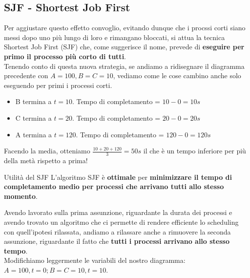 \documentclass[12pt]{report}
\begin{document}
	\subsection{SJF - Shortest Job First}
	Per aggiustare questo effetto convoglio, evitando dunque che i procssi corti siano messi dopo uno più lungo di loro e rimangano bloccati, si attua la tecnica Shortest Job First (SJF) che, come suggerisce il nome, prevede di \textbf{eseguire per primo il processo più corto di tutti}.\\
	Tenendo conto di questa nuova strategia, se andiamo a ridisegnare il diagramma precedente con $A=100, B=C=10$, vediamo come le cose cambino anche solo eseguendo per primi i processi corti.
	\begin{figure}[htbp]
		\centering
	\end{figure}
	\begin{itemize}
		\item B termina a $t=10$. Tempo di completamento = $10-0=10s$
		\item C termina a $t=20$. Tempo di completamento = $20-0=20s$
		\item A termina a $t=120$. Tempo di completamento = $120-0=120s$
	\end{itemize}
	Facendo la media, otteniamo $\frac{10+20+120}{3} = 50s$ il che è un tempo inferiore per più della metà rispetto a prima!\\
	\begin{osservazione}{Utilità del SJF}{}
		L'algoritmo SJF è \textbf{ottimale} per \textbf{minimizzare il tempo di completamento medio per processi che arrivano tutti allo stesso momento}.
	\end{osservazione}
	\smallbreak
	
	Avendo lavorato sulla prima assunzione, riguardante la durata dei processi e avendo trovato un algoritmo che ci permette di rendere efficiente lo scheduling con quell'ipotesi rilassata, andiamo a rilassare anche a rimuovere la seconda assunzione, riguardante il fatto che \textbf{tutti i processi arrivano allo stesso tempo}.\\
	Modifichiamo leggermente le variabili del nostro diagramma: $A=100, t=0; B=C=10, t=10$.
	
\end{document}
